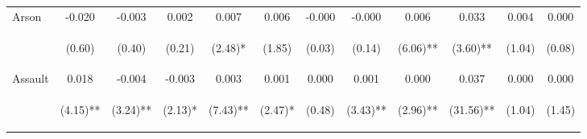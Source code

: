 \begin{tabular}{lccccccccccc}
\noalign{\smallskip}Arson & -0.020 & -0.003 & 0.002 & 0.007 & 0.006 & -0.000 & -0.000 & 0.006 & 0.033 & 0.004 & 0.000\\
 & \begin{footnotesize}(0.60)\end{footnotesize} & \begin{footnotesize}(0.40)\end{footnotesize} & \begin{footnotesize}(0.21)\end{footnotesize} & \begin{footnotesize}(2.48)*\end{footnotesize} & \begin{footnotesize}(1.85)\end{footnotesize} & \begin{footnotesize}(0.03)\end{footnotesize} & \begin{footnotesize}(0.14)\end{footnotesize} & \begin{footnotesize}(6.06)**\end{footnotesize} & \begin{footnotesize}(3.60)**\end{footnotesize} & \begin{footnotesize}(1.04)\end{footnotesize} & \begin{footnotesize}(0.08)\end{footnotesize}\\
\noalign{\smallskip}Assault & 0.018 & -0.004 & -0.003 & 0.003 & 0.001 & 0.000 & 0.001 & 0.000 & 0.037 & 0.000 & 0.000\\
 & \begin{footnotesize}(4.15)**\end{footnotesize} & \begin{footnotesize}(3.24)**\end{footnotesize} & \begin{footnotesize}(2.13)*\end{footnotesize} & \begin{footnotesize}(7.43)**\end{footnotesize} & \begin{footnotesize}(2.47)*\end{footnotesize} & \begin{footnotesize}(0.48)\end{footnotesize} & \begin{footnotesize}(3.43)**\end{footnotesize} & \begin{footnotesize}(2.96)**\end{footnotesize} & \begin{footnotesize}(31.56)**\end{footnotesize} & \begin{footnotesize}(1.04)\end{footnotesize} & \begin{footnotesize}(1.45)\end{footnotesize}\\

\end{tabular}
